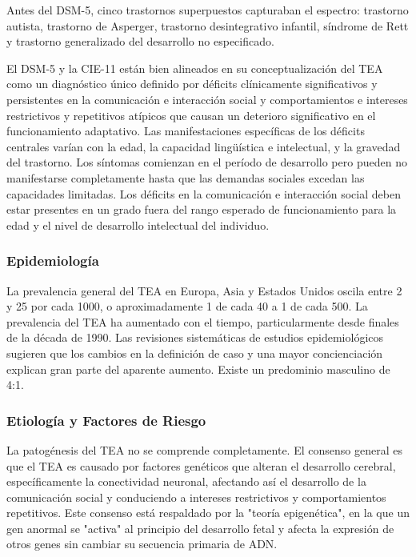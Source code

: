 \documentclass[11pt,letterpaper]{report}
\begin{document}
Antes del DSM-5, cinco trastornos superpuestos capturaban el espectro:
trastorno autista, trastorno de Asperger, trastorno desintegrativo infantil,
síndrome de Rett y trastorno generalizado del desarrollo no especificado.
\cite{Boland2021-by}

El DSM-5 y la CIE-11 están bien alineados en su conceptualización del TEA como
un diagnóstico único definido por déficits clínicamente significativos y
persistentes en la comunicación e interacción social y comportamientos e
intereses restrictivos y repetitivos atípicos que causan un deterioro
significativo en el funcionamiento adaptativo. Las manifestaciones específicas
de los déficits centrales varían con la edad, la capacidad lingüística e
intelectual, y la gravedad del trastorno. Los síntomas comienzan en el período
de desarrollo pero pueden no manifestarse completamente hasta que las demandas
sociales excedan las capacidades limitadas. Los déficits en la comunicación e
interacción social deben estar presentes en un grado fuera del rango esperado
de funcionamiento para la edad y el nivel de desarrollo intelectual del
individuo. \cite{DSM5TR, Myers2025}

\subsubsection{Epidemiología}
La prevalencia general del TEA en Europa, Asia y Estados Unidos oscila entre 2
y 25 por cada 1000, o aproximadamente 1 de cada 40 a 1 de cada 500. La
prevalencia del TEA ha aumentado con el tiempo, particularmente desde finales
de la década de 1990. Las revisiones sistemáticas de estudios epidemiológicos
sugieren que los cambios en la definición de caso y una mayor concienciación
explican gran parte del aparente aumento. Existe un predominio masculino de 4:1.
\cite{AutismUpToDate, Nelson58}

\subsubsection{Etiología y Factores de Riesgo}
La patogénesis del TEA no se comprende completamente. El consenso general es
que el TEA es causado por factores genéticos que alteran el desarrollo
cerebral, específicamente la conectividad neuronal, afectando así el
desarrollo de la comunicación social y conduciendo a intereses restrictivos y
comportamientos repetitivos. Este consenso está respaldado por la "teoría
epigenética", en la que un gen anormal se "activa" al principio del desarrollo
fetal y afecta la expresión de otros genes sin cambiar su secuencia primaria
de ADN. \cite{AutismUpToDate}
\end{document}

